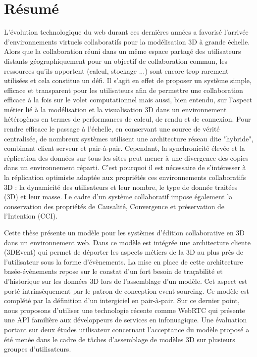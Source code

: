 \clearpage
\section*{Résumé}

L’évolution technologique du web durant ces dernières années a favorisé l’arrivée d’environnements virtuels collaboratifs pour la modélisation 3D à grande échelle. Alors que la collaboration réuni dans un même espace partagé des utilisateurs distants géographiquement pour un objectif de collaboration commun, les ressources qu'ils apportent (calcul, stockage ...) sont encore trop rarement utilisées et cela constitue un défi. Il s'agit en effet de proposer un système simple, efficace et transparent pour les utilisateurs afin de permettre une collaboration efficace à la fois sur le volet computationnel mais aussi, bien entendu, sur l'aspect métier lié à la modélisation et la visualisation 3D dans un environnement hétérogènes en termes de performances de calcul, de rendu et de connexion.
Pour rendre efficace le passage à l’échelle, en conservant une source de vérité centralisée, de nombreux systèmes utilisent une architecture réseau dite "hybride", combinant client serveur et pair-à-pair. Cependant, la synchronicité élevée et la réplication des données sur tous les sites peut mener à une divergence des copies dans un environnement réparti. C’est pourquoi il est nécessaire de s’intéresser à la réplication optimiste adaptée aux propriétés ces environnements collaboratifs 3D : la dynamicité des utilisateurs et leur nombre, le type de donnée traitées (3D) et leur masse. Le cadre d’un système collaboratif impose également la conservation des propriétés de Causalité, Convergence et préservation de l’Intention (CCI).

Cette thèse présente un modèle pour les systèmes d’édition collaborative en 3D dans un environnement web. Dans ce modèle est intégrée une architecture cliente (3DEvent) qui permet de déporter les aspects métiers de la 3D au plus près de l’utilisateur sous la forme d’évènements. La mise en place de cette architecture basée-évènements repose sur le constat d’un fort besoin de traçabilité et d’historique sur les données 3D lors de l’assemblage d’un modèle. Cet aspect est porté intrinsèquement par le patron de conception event-sourcing. Ce modèle est complété par la définition d’un intergiciel en pair-à-pair. Sur ce dernier point, nous proposons d'utiliser une technologie récente comme WebRTC qui présente une API familière aux développeurs de services en infonuagique. Une évaluation portant sur deux études utilisateur concernant l’acceptance du modèle proposé a été menée dans le cadre de tâches d’assemblage de modèles 3D sur plusieurs groupes d’utilisateurs.

